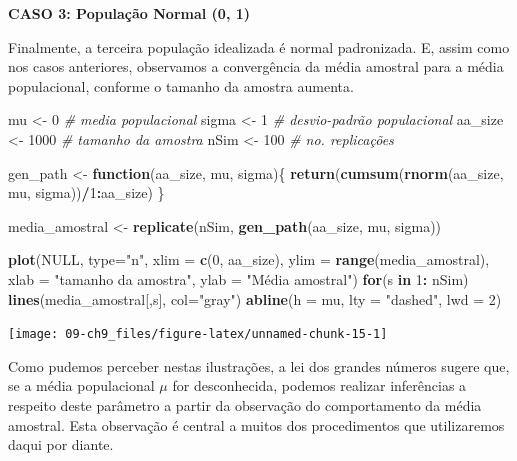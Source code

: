 \documentclass[
]{book}
\newenvironment{Shaded}{\begin{snugshade}}{\end{snugshade}}
\newcommand{\CommentTok}[1]{\textcolor[rgb]{0.56,0.35,0.01}{\textit{#1}}}
\newcommand{\ControlFlowTok}[1]{\textcolor[rgb]{0.13,0.29,0.53}{\textbf{#1}}}
\newcommand{\DataTypeTok}[1]{\textcolor[rgb]{0.13,0.29,0.53}{#1}}
\newcommand{\DecValTok}[1]{\textcolor[rgb]{0.00,0.00,0.81}{#1}}
\newcommand{\KeywordTok}[1]{\textcolor[rgb]{0.13,0.29,0.53}{\textbf{#1}}}
\newcommand{\NormalTok}[1]{#1}
\newcommand{\OperatorTok}[1]{\textcolor[rgb]{0.81,0.36,0.00}{\textbf{#1}}}
\newcommand{\OtherTok}[1]{\textcolor[rgb]{0.56,0.35,0.01}{#1}}
\newcommand{\StringTok}[1]{\textcolor[rgb]{0.31,0.60,0.02}{#1}}
\theoremstyle{definition}
\theoremstyle{definition}
\theoremstyle{definition}
\theoremstyle{remark}
\begin{document}
\textbf{CASO 3: População Normal (0, 1)}

Finalmente, a terceira população idealizada é normal padronizada. E, assim como nos casos anteriores, observamos a convergência da média amostral para a média populacional, conforme o tamanho da amostra aumenta.

\begin{Shaded}
\begin{Highlighting}[]
\NormalTok{mu      <-}\StringTok{ }\DecValTok{0}      \CommentTok{# media populacional}
\NormalTok{sigma   <-}\StringTok{ }\DecValTok{1}      \CommentTok{# desvio-padrão populacional}
\NormalTok{aa_size <-}\StringTok{ }\DecValTok{1000}   \CommentTok{# tamanho da amostra}
\NormalTok{nSim    <-}\StringTok{ }\DecValTok{100}    \CommentTok{# no. replicações}

\NormalTok{gen_path <-}\StringTok{ }\ControlFlowTok{function}\NormalTok{(aa_size, mu, sigma)\{}
  \KeywordTok{return}\NormalTok{(}\KeywordTok{cumsum}\NormalTok{(}\KeywordTok{rnorm}\NormalTok{(aa_size, mu, sigma))}\OperatorTok{/}\DecValTok{1}\OperatorTok{:}\NormalTok{aa_size)}
\NormalTok{\}}
  
\NormalTok{media_amostral <-}\StringTok{ }\KeywordTok{replicate}\NormalTok{(nSim, }\KeywordTok{gen_path}\NormalTok{(aa_size, mu, sigma))}

\KeywordTok{plot}\NormalTok{(}\OtherTok{NULL}\NormalTok{, }\DataTypeTok{type=}\StringTok{"n"}\NormalTok{, }
     \DataTypeTok{xlim =} \KeywordTok{c}\NormalTok{(}\DecValTok{0}\NormalTok{, aa_size), }
     \DataTypeTok{ylim =} \KeywordTok{range}\NormalTok{(media_amostral),}
     \DataTypeTok{xlab =} \StringTok{"tamanho da amostra"}\NormalTok{,}
     \DataTypeTok{ylab =} \StringTok{"Média amostral"}\NormalTok{)}
\ControlFlowTok{for}\NormalTok{(s }\ControlFlowTok{in} \DecValTok{1}\OperatorTok{:}\StringTok{ }\NormalTok{nSim) }\KeywordTok{lines}\NormalTok{(media_amostral[,s], }\DataTypeTok{col=}\StringTok{"gray"}\NormalTok{)}
\KeywordTok{abline}\NormalTok{(}\DataTypeTok{h =}\NormalTok{ mu, }\DataTypeTok{lty =} \StringTok{"dashed"}\NormalTok{, }\DataTypeTok{lwd =} \DecValTok{2}\NormalTok{)}
\end{Highlighting}
\end{Shaded}

\begin{center}\texttt{[image: 09-ch9\_files/figure-latex/unnamed-chunk-15-1]} \end{center}

Como pudemos perceber nestas ilustrações, a lei dos grandes números sugere que, se a média populacional \(\mu\) for desconhecida, podemos realizar inferências a respeito deste parâmetro a partir da observação do comportamento da média amostral. Esta observação é central a muitos dos procedimentos que utilizaremos daqui por diante.
\end{document}
